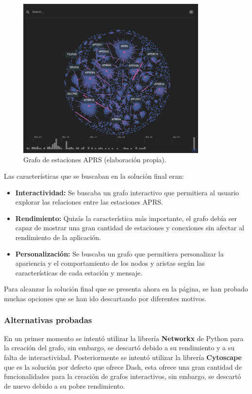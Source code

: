 \begin{figure}[h]
	\centering
	\includegraphics[width=0.85\textwidth]{Imagenes/Chapter_4/graph.png}
	\caption[Grafo de estaciones APRS.]{Grafo de estaciones APRS (elaboración propia).}
	\label{fig:graph}
\end{figure}

Las características que se buscaban en la solución final eran:

\begin{itemize}
	\item \textbf{Interactividad:} Se buscaba un grafo interactivo que permitiera al usuario explorar las relaciones entre las estaciones APRS.
	\item \textbf{Rendimiento:} Quizás la característica más importante, el grafo debía ser capaz de mostrar una gran cantidad de estaciones y conexiones sin afectar al rendimiento de la aplicación.
	\item \textbf{Personalización:} Se buscaba un grafo que permitiera personalizar la apariencia y el comportamiento de los nodos y aristas según las características de cada estación y mensaje.
\end{itemize}
Para alcanzar la solución final que se presenta ahora en la página, se han probado muchas opciones que se han ido descartando por diferentes motivos.
\subsubsection*{Alternativas probadas}
En un primer momento se intentó utilizar la librería \textbf{Networkx} de Python para la creación del grafo, sin embargo, se descartó debido a su rendimiento y a su falta de interactividad. Posteriormente se intentó utilizar la librería \textbf{Cytoscape} que es la solución por defecto que ofrece Dash, esta ofrece una gran cantidad de funcionalidades para la creación de grafos interactivos, sin embargo, se descartó de nuevo debido a su pobre rendimiento.

